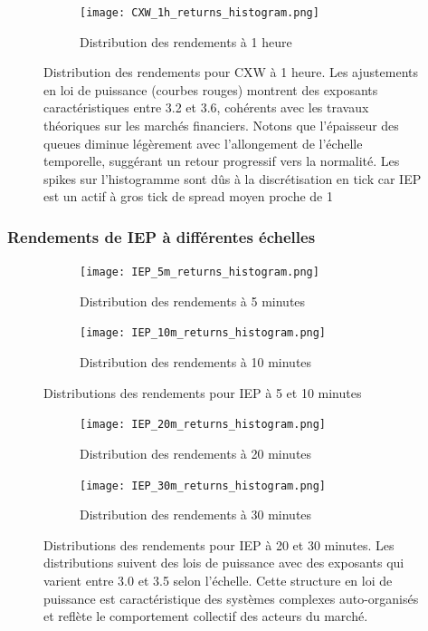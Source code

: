 \documentclass[10pt,a4paper]{article}
\theoremstyle{definition}
\theoremstyle{remark}
\begin{document}
\begin{figure}[H]
    \centering
    \begin{subfigure}[b]{0.45\textwidth}
        \texttt{[image: CXW\_1h\_returns\_histogram.png]}
        \caption{Distribution des rendements à 1 heure}
        \label{fig:CXW_1h_moved}
    \end{subfigure}
    \caption{Distribution des rendements pour CXW à 1 heure. Les ajustements en loi de puissance (courbes rouges) montrent des exposants caractéristiques entre 3.2 et 3.6, cohérents avec les travaux théoriques sur les marchés financiers. Notons que l'épaisseur des queues diminue légèrement avec l'allongement de l'échelle temporelle, suggérant un retour progressif vers la normalité. Les spikes sur l'histogramme sont dûs à la discrétisation en tick car IEP est un actif à gros tick de spread moyen proche de 1}
    \label{fig:CXW_multi_scale_moved}
\end{figure}

\subsubsection{Rendements de IEP à différentes échelles}

\begin{figure}[H]
    \centering
    \begin{subfigure}[b]{0.45\textwidth}
        \texttt{[image: IEP\_5m\_returns\_histogram.png]}
        \caption{Distribution des rendements à 5 minutes}
        \label{fig:IEP_5m_moved}
    \end{subfigure}
    \hfill
    \begin{subfigure}[b]{0.45\textwidth}
        \texttt{[image: IEP\_10m\_returns\_histogram.png]}
        \caption{Distribution des rendements à 10 minutes}
        \label{fig:IEP_10m_moved}
    \end{subfigure}
    \caption{Distributions des rendements pour IEP à 5 et 10 minutes}
\end{figure}

\begin{figure}[H]
    \centering
    \begin{subfigure}[b]{0.45\textwidth}
        \texttt{[image: IEP\_20m\_returns\_histogram.png]}
        \caption{Distribution des rendements à 20 minutes}
        \label{fig:IEP_20m_moved}
    \end{subfigure}
    \hfill
    \begin{subfigure}[b]{0.45\textwidth}
        \texttt{[image: IEP\_30m\_returns\_histogram.png]}
        \caption{Distribution des rendements à 30 minutes}
        \label{fig:IEP_30m_moved}
    \end{subfigure}
    \caption{Distributions des rendements pour IEP à 20 et 30 minutes. Les distributions suivent des lois de puissance avec des exposants qui varient entre 3.0 et 3.5 selon l'échelle. Cette structure en loi de puissance est caractéristique des systèmes complexes auto-organisés et reflète le comportement collectif des acteurs du marché.}
    \label{fig:IEP_multi_scale_moved}
\end{figure}
\end{document}
